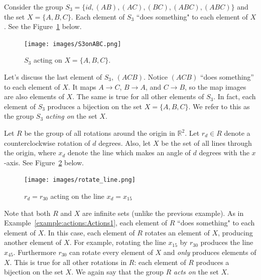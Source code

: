 \begin{example}\label{example:actions:Actions1} Consider the group $S_3=\{id,(AB),(AC),(BC),(ABC),(ABC)\}$ and the set $X=\{A,B,C\}$. Each element of $S_3$ ``does something" to each element of $X$. See the Figure~\ref{fig:S3onABC} below.

\begin{figure}[htbp]
\begin{center}
\texttt{[image: images/S3onABC.png]}
\caption{$S_3$ acting on $X=\{A,B,C\}$.}\label{fig:S3onABC}
\end{center}
\end{figure}

Let's discuss the last element of $S_3$, $(ACB)$. Notice $(ACB)$ ``does something'' to each element of $X$. It maps $A\rightarrow C$, $B\rightarrow A$, and $C\rightarrow B$, so the map images are also elements of $X$. The same is true for all other elements of $S_3$. In fact, each element of $S_3$ produces a bijection on the set $X=\{A,B,C\}$. We refer to this as the group $S_3$ \emph{acting on} the set $X$.
\end{example} 

\begin{example}\label{example:actions:Actions2} Let $R$ be the group of all rotations around the origin in $\mathbb{R}^2$. Let $r_d\in R$ denote a counterclockwise rotation of $d$ degrees. Also, let $X$ be the set of all lines through the origin, where $x_d$ denote the line which makes an angle of $d$ degrees with the $x$-axis. See Figure~\ref{fig:rotate_line} below.

\begin{figure}[htbp]
\begin{center}
\texttt{[image: images/rotate\_line.png]}
\caption{$r_d=r_{30}$ acting on the line $x_d=x_{15}$}\label{fig:rotate_line}
\end{center}
\end{figure}

Note that both $R$ and $X$ are infinite sets (unlike the previous example). As in Example~\ref{example:actions:Actions1}, each element of $R$ ``does something" to each element of $X$. In this case, each element of $R$ rotates an element of $X$, producing another element of $X$. For example, rotating the line $x_{15}$ by $r_{30}$ produces the line $x_{45}$. Furthermore $r_{30}$ can rotate every element of $X$ and \emph{only} produces elements of $X$. This is true for all other rotations in $R$: each element of $R$ produces a bijection on the set $X$. We again say that the group $R$ \emph{acts on} the set $X$.
\end{example}

